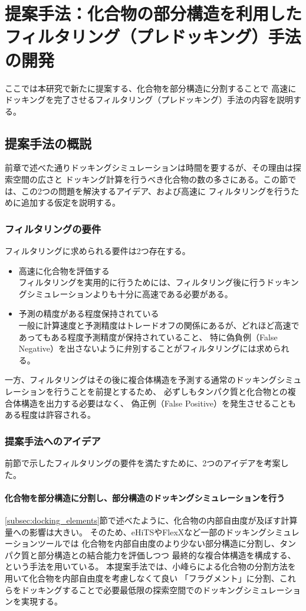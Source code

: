 \chapter{提案手法：化合物の部分構造を利用したフィルタリング（プレドッキング）手法の開発}
ここでは本研究で新たに提案する、化合物を部分構造に分割することで
高速にドッキングを完了させるフィルタリング（プレドッキング）手法の内容を説明する。

\section{提案手法の概説}
前章で述べた通りドッキングシミュレーションは時間を要するが、その理由は探索空間の広さと
ドッキング計算を行うべき化合物の数の多さにある。この節では、この2つの問題を解決するアイデア、および高速に
フィルタリングを行うために追加する仮定を説明する。

\subsection{フィルタリングの要件}\label{subsec}
フィルタリングに求められる要件は2つ存在する。
\begin{itemize}
\item 高速に化合物を評価する\\
	フィルタリングを実用的に行うためには、フィルタリング後に行うドッキングシミュレーションよりも十分に高速である必要がある。
\item 予測の精度がある程度保持されている\\
	一般に計算速度と予測精度はトレードオフの関係にあるが、どれほど高速であってもある程度予測精度が保持されていること、
	特に偽負例（False Negative）を出さないように弁別することがフィルタリングには求められる。
\end{itemize}
一方、フィルタリングはその後に複合体構造を予測する通常のドッキングシミュレーションを行うことを前提とするため、
必ずしもタンパク質と化合物との複合体構造を出力する必要はなく、
偽正例（False Positive）を発生させることもある程度は許容される。

\subsection{提案手法へのアイデア}\label{subsec:idea}
前節で示したフィルタリングの要件を満たすために、2つのアイデアを考案した。

\subsubsection{化合物を部分構造に分割し、部分構造のドッキングシミュレーションを行う}
\ref{subsec:docking_elements}節で述べたように、化合物の内部自由度が及ぼす計算量への影響は大きい。
そのため、eHiTS\cite{Zsoldos2007}やFlexX\cite{Rarey1996}など一部のドッキングシミュレーションツールでは
化合物を内部自由度のより少ない部分構造に分割し、タンパク質と部分構造との結合能力を評価しつつ
最終的な複合体構造を構成する、という手法を用いている。
本提案手法では、小峰ら\cite{Shunta2015}による化合物の分割方法を用いて化合物を内部自由度を考慮しなくて良い
「フラグメント」に分割、これらをドッキングすることで必要最低限の探索空間でのドッキングシミュレーションを実現する。


